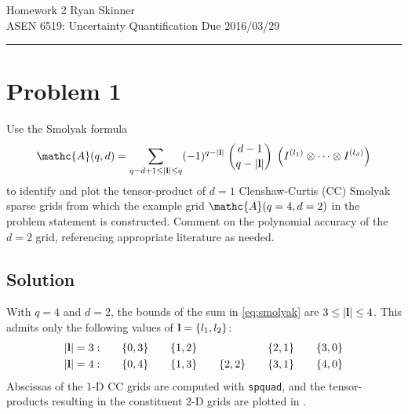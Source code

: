 \documentclass[11pt]{article}
\begin{document}
\newcommand{\widesim}[2][1.5]{
  \mathrel{\overset{#2}{\scalebox{#1}[1]{$\sim$}}}
}

\pagestyle{fancyplain}
\lhead{}
\chead{}
\rhead{}
\cfoot{\hrule \thepage}

\noindent
{\Large Homework 2}
\hfill
{\large Ryan Skinner}
\\[0.5ex]
{\large ASEN 6519: Uncertainty Quantification}
\hfill
{\large Due 2016/03/29}\\
\hrule
\vspace{6pt}

\section*{Problem 1} %

Use the Smolyak formula
\begin{equation}
\mathc{A}(q,d) = \sum_{q-d+1 \le |\mb{l}| \le q} (-1)^{q-|\mb{l}|} \; \binom{d-1}{q-|\mb{l}|} \; \left( I^{(l_1)} \otimes \cdots \otimes I^{(l_d)} \right)
\label{eq:smolyak}
\end{equation}
to identify and plot the tensor-product of $d=1$ Clenshaw-Curtis (CC) Smolyak sparse grids from which the example grid $\mathc{A}(q=4,d=2)$ in the problem statement is constructed. Comment on the polynomial accuracy of the $d=2$ grid, referencing appropriate literature as needed.

\subsection*{Solution}

With $q=4$ and $d=2$, the bounds of the sum in \eqref{eq:smolyak} are $3 \le |\mb{l}| \le 4$. This admits only the following values of $\mb{l} = \{ l_1, l_2 \}$:
\begin{align*}
|\mb{l}| = 3: &\qquad \{ 0,3 \} \qquad \{ 1,2 \} \qquad \hphantom{\{ 2,2 \}} \qquad \{ 2,1 \} \qquad \{ 3,0 \} \\
|\mb{l}| = 4: &\qquad \{ 0,4 \} \qquad \{ 1,3 \} \qquad \{ 2,2 \} \qquad \{ 3,1 \} \qquad \{ 4,0 \}
\end{align*}
Abscissas of the 1-D CC grids are computed with \lstinline|spquad|, and the tensor-products resulting in the constituent 2-D grids are plotted in .
\end{document}
